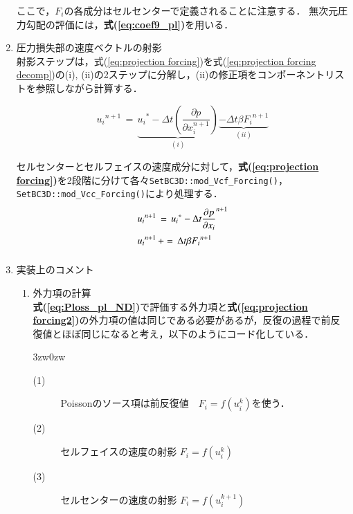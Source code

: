 \begin{enumerate}
ここで，$F_i$の各成分はセルセンターで定義されることに注意する．
無次元圧力勾配の評価には，\textbf{式(\ref{eq:coef9_pl})}を用いる．
\vspace{2mm}

\item 圧力損失部の速度ベクトルの射影\\
射影ステップは，式(\ref{eq:projection forcing})を式(\ref{eq:projection forcing decomp})の(i), (ii)の2ステップに分解し，(ii)の修正項をコンポーネントリストを参照しながら計算する．

\begin{equation}
{u_{i}}^{n+1} \,=\,  
\underbrace{ {u_{i}}^{*} - \Delta{t} \left({ \frac{\partial p}{\partial x_{i}^{n+1}} }\right) }\limits_{(i)}
\underbrace{ - \Delta{t} \beta {F_{i}}^{n+1} }\limits_{(ii)}
\label{eq:projection forcing decomp}
\end{equation}

セルセンターとセルフェイスの速度成分に対して，\textbf{式(\ref{eq:projection forcing})}を2段階に分けて各々\verb|SetBC3D::mod_Vcf_Forcing()|，\verb|SetBC3D::mod_Vcc_Forcing()|により処理する．
\begin{equation}
\begin{array}{l}
\displaystyle{ {u_{i}}^{n+1} \,=\, {{u}_{i}}^{*} - \Delta{t} {\frac{\partial p}{\partial x_i}}^{n+1} }\vspace{2mm}\\
\displaystyle{ {u_{i}}^{n+1} \,+=\, \Delta{t} \beta {F_{i}}^{n+1} }\vspace{2mm}\\
\end{array}
\label{eq:projection forcing2}
\end{equation}
\vspace{2mm}

\item 実装上のコメント\\
\begin{enumerate}
\item 外力項の計算\\
\textbf{式(\ref{eq:Ploss_pl_ND})}で評価する外力項と\textbf{式(\ref{eq:projection forcing2})}の外力項の値は同じである必要があるが，反復の過程で前反復値とほぼ同じになると考え，以下のようにコード化している．

\begin{indentation}{3zw}{0zw}
\begin{description}
\item[(1)] Poissonのソース項は前反復値　$F_i = f(u_i^k)$を使う．
\item[(2)] セルフェイスの速度の射影 $F_i = f(u_i^k)$
\item[(3)] セルセンターの速度の射影 $F_i = f(u_i^{k+1})$
\end{description}
\end{indentation}


\end{enumerate}
\end{enumerate}
